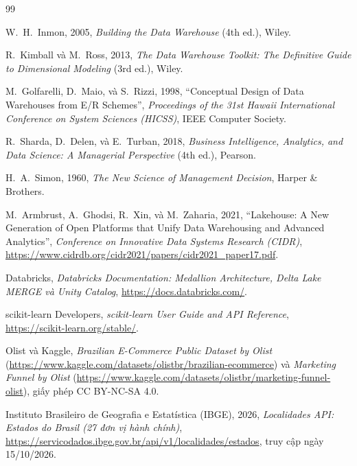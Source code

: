 \documentclass[a4paper]{article}
\begin{document}
\newpage
{}
{}
\begin{thebibliography}{99}

W.~H.~Inmon, 2005, \textit{Building the Data Warehouse} (4th ed.), Wiley.

R.~Kimball và M.~Ross, 2013, \textit{The Data Warehouse Toolkit: The Definitive Guide to Dimensional Modeling} (3rd ed.), Wiley.

M.~Golfarelli, D.~Maio, và S.~Rizzi, 1998, ``Conceptual Design of Data Warehouses from E/R Schemes'', \textit{Proceedings of the 31st Hawaii International Conference on System Sciences (HICSS)}, IEEE Computer Society.

R.~Sharda, D.~Delen, và E.~Turban, 2018, \textit{Business Intelligence, Analytics, and Data Science: A Managerial Perspective} (4th ed.), Pearson.

H.~A.~Simon, 1960, \textit{The New Science of Management Decision}, Harper \& Brothers.

M.~Armbrust, A.~Ghodsi, R.~Xin, và M.~Zaharia, 2021, ``Lakehouse: A New Generation of Open Platforms that Unify Data Warehousing and Advanced Analytics'', \textit{Conference on Innovative Data Systems Research (CIDR)}, \url{https://www.cidrdb.org/cidr2021/papers/cidr2021_paper17.pdf}.

Databricks, \textit{Databricks Documentation: Medallion Architecture, Delta Lake MERGE và Unity Catalog}, \url{https://docs.databricks.com/}.

scikit-learn Developers, \textit{scikit-learn User Guide and API Reference}, \url{https://scikit-learn.org/stable/}.

Olist và Kaggle, \textit{Brazilian E-Commerce Public Dataset by Olist} (\url{https://www.kaggle.com/datasets/olistbr/brazilian-ecommerce}) và \textit{Marketing Funnel by Olist} (\url{https://www.kaggle.com/datasets/olistbr/marketing-funnel-olist}), giấy phép CC BY-NC-SA 4.0.

Instituto Brasileiro de Geografia e Estatística (IBGE), 2026, \textit{Localidades API: Estados do Brasil (27 đơn vị hành chính)}, \url{https://servicodados.ibge.gov.br/api/v1/localidades/estados}, truy cập ngày 15/10/2026.


\end{thebibliography}
\end{document}
